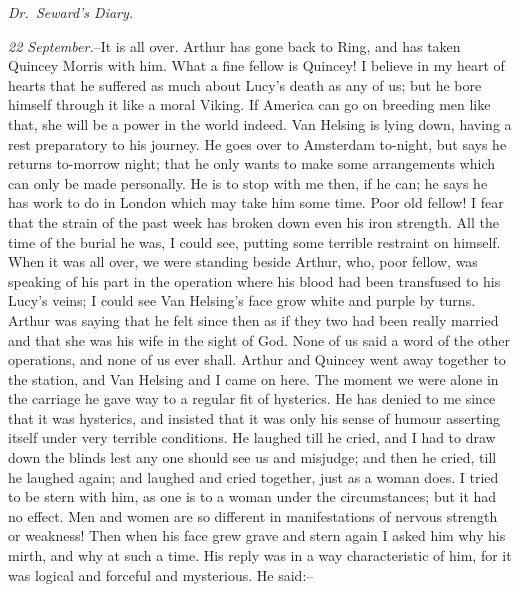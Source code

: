 \documentclass[12pt,openright]{book}
\begin{document}
\textit{Dr. Seward’s Diary.}

\textit{22 September.}–It is all over. Arthur has gone back to Ring, and has taken Quincey Morris with him. What a fine fellow is Quincey! I believe in my heart of hearts that he suffered as much about Lucy’s death as any of us; but he bore himself through it like a moral Viking. If America can go on breeding men like that, she will be a power in the world indeed. Van Helsing is lying down, having a rest preparatory to his journey. He goes over to Amsterdam to-night, but says he returns to-morrow night; that he only wants to make some arrangements which can only be made personally. He is to stop with me then, if he can; he says he has work to do in London which may take him some time. Poor old fellow! I fear that the strain of the past week has broken down even his iron strength. All the time of the burial he was, I could see, putting some terrible restraint on himself. When it was all over, we were standing beside Arthur, who, poor fellow, was speaking of his part in the operation where his blood had been transfused to his Lucy’s veins; I could see Van Helsing’s face grow white and purple by turns. Arthur was saying that he felt since then as if they two had been really married and that she was his wife in the sight of God. None of us said a word of the other operations, and none of us ever shall. Arthur and Quincey went away together to the station, and Van Helsing and I came on here. The moment we were alone in the carriage he gave way to a regular fit of hysterics. He has denied to me since that it was hysterics, and insisted that it was only his sense of humour asserting itself under very terrible conditions. He laughed till he cried, and I had to draw down the blinds lest any one should see us and misjudge; and then he cried, till he laughed again; and laughed and cried together, just as a woman does. I tried to be stern with him, as one is to a woman under the circumstances; but it had no effect. Men and women are so different in manifestations of nervous strength or weakness! Then when his face grew grave and stern again I asked him why his mirth, and why at such a time. His reply was in a way characteristic of him, for it was logical and forceful and mysterious. He said:–
\end{document}
